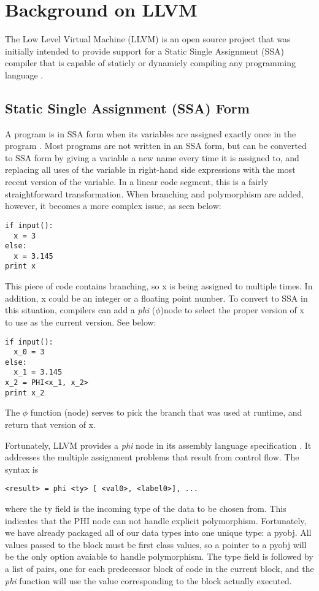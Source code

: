 \documentclass[11pt]{article}
\begin{document}
\section{Background on LLVM}

The Low Level Virtual Machine (LLVM) is an open source project that was initially intended to provide support for a Static Single Assignment (SSA) compiler that is capable of staticly or dynamicly compiling any programming language \cite{llvm.org}.

\subsection{Static Single Assignment (SSA) Form}

A program is in SSA form when its variables are assigned exactly once in the program \cite{gcc-gnu.org}. Most programs are not written in an SSA form, but can be converted to SSA form by giving a variable a new name every time it is assigned to, and replacing all uses of the variable in right-hand side expressions with the most recent version of the variable. In a linear code segment, this is a fairly straightforward transformation. When branching and polymorphism are added, however, it becomes a more complex issue, as seen below:
\begin{verbatim}
if input():
  x = 3
else:
  x = 3.145
print x
\end{verbatim}
This piece of code contains branching, so x is being assigned to multiple times. In addition, x could be an integer or a floating point number. To convert to SSA in this situation, compilers can add a \emph{phi} ($\phi$)node to select the proper version of x to use as the current version. See below:
\begin{verbatim}
if input():
  x_0 = 3
else:
  x_1 = 3.145
x_2 = PHI<x_1, x_2>
print x_2
\end{verbatim}
The $\phi$ function (node) serves to pick the branch that was used at runtime, and return that version of x.

Fortunately, LLVM provides a \emph{phi} node in its assembly language specification \cite{llvm.org}. It addresses the multiple assignment problems that result from control flow. The syntax is
\begin{verbatim}
<result> = phi <ty> [ <val0>, <label0>], ...
\end{verbatim} 
where the ty field is the incoming type of the data to be chosen from. This indicates that the PHI node can not handle explicit polymorphism. Fortunately, we have already packaged all of our data types into one unique type: a pyobj. All values passed to the block must be first class values, so a pointer to a pyobj will be the only option avaiable to handle polymorphism. The type field is followed by a list of pairs, one for each predecessor block of code in the current block, and the \emph{phi} function will use the value corresponding to the block actually executed.
\end{document}
